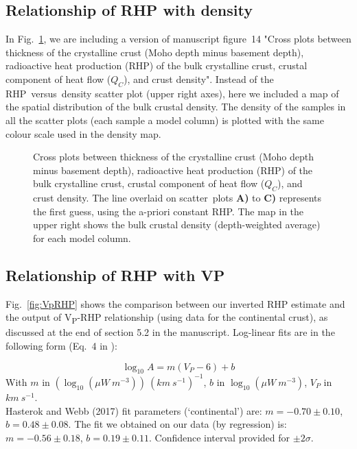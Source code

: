 {\begin{subappendices}
\subsection{Relationship of RHP with density}
\label{ss:ApplSup:Rel:Rho}

In Fig.~\ref{fig:RhoRHP}, we are including a version of manuscript figure~14 "Cross plots between thickness of the crystalline crust (Moho depth minus basement depth), radioactive heat production (RHP) of the bulk crystalline crust, crustal component of heat flow ($Q_C$), and crust density".
Instead of the RHP~versus~density scatter plot (upper right axes), here we included a map of the spatial distribution of the bulk crustal density.
The density of the samples in all the scatter plots (each sample a model column) is plotted with the same colour scale used in the density map.

\begin{figure}
	\begin{adjustbox}{center}
	\end{adjustbox}
	\caption{Cross plots between thickness of the crystalline crust (Moho depth minus basement depth), radioactive heat production (RHP) of the bulk crystalline crust, crustal component of heat flow ($Q_C$), and crust density. The line overlaid on scatter~plots \textbf{A)} to \textbf{C)} represents the first guess, using the a-priori constant RHP.
	The map in the upper right shows the bulk crustal density (depth-weighted average) for each model column.}
	\label{fig:RhoRHP}
\end{figure}

\subsection{Relationship of RHP with VP}
\label{ss:ApplSup:Rel:VP}

Fig.~\ref{fig:VpRHP} shows the comparison between our inverted RHP estimate and the output of \parencite{Hasterok2017_ign} V\textsubscript{P}-RHP relationship (using data for the continental crust), as discussed at the end of section 5.2 in the manuscript.
Log-linear fits are in the following form (Eq.~4 in \cite{Hasterok2017_ign}):

\begin{equation*}
	\log_{10} A = m (V_{P} - 6) + b
\end{equation*}
With $m$ in $(\log_{10} (\mu W \ m^{-3})) \ (km \ s^{-1})^{-1}$, $b$ in $\log_{10} (\mu W \ m^{-3})$, $V_{P}$ in $km \ s^{-1}$. \\
Hasterok and Webb (2017) fit parameters (`continental') are: $m = -0.70 \pm 0.10$, $b = 0.48 \pm 0.08$.
The fit we obtained on our data (by regression) is: $m = -0.56 \pm 0.18$, $b = 0.19 \pm 0.11$.
Confidence interval provided for $\pm 2 \sigma$.


\end{subappendices}}
